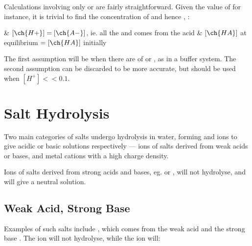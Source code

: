 			Calculations involving only \Ka{} or \Kb{} are fairly straightforward. Given the value of \Ka{} for instance, it is trivial
			to find the concentration of  and hence \pH{}, :

			\begin{bulletlist}
				& $[\ch{H+}] = [\ch{A-}]$, ie. all the  and  comes from the acid
				& $[\ch{HA}]$ at equilibrium $ = [\ch{HA}]$ initially
			\end{bulletlist}

			The first assumption will be  when there are  of  or , as in a buffer
			system. The second assumption can be discarded to be more accurate, but should be used when $[H^{+}] << 0.1$.



	\pagebreak
	\section{Salt Hydrolysis}

		Two main categories of salts undergo hydrolysis in water, forming  and  ions to give acidic or basic solutions
		respectively --- ions of salts derived from weak acids or bases, and metal cations with a high charge density.

		Ions of salts derived from strong acids and bases, eg.  or , will not hydrolyse, and will give a neutral solution.


		\subsection{Weak Acid, Strong Base}

			Examples of such salts include , which comes from the weak acid  and the strong base .
			The  ion will not hydrolyse, while the  ion will:


